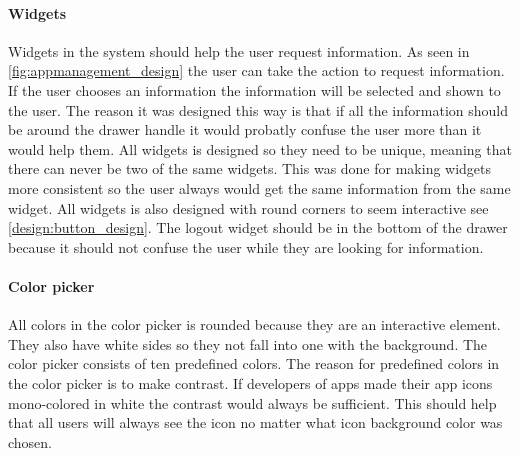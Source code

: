 \paragraph{Widgets}
\label{par:widgets}
Widgets in the \giraf[] system should help the user request information. As seen in \autoref{fig:appmanagement_design} the user can take the action to request information. If the user chooses an information the information will be selected and shown to the user.
The reason it was designed this way is that if all the information should be around the drawer handle it would probatly confuse the user more than it would help them.
All widgets is designed so they need to be unique, meaning that there can never be two of the same widgets. This was done for making widgets more consistent so the user always would get the same information from the same widget. All widgets is also designed with round corners to seem interactive see \autoref{design:button_design}.
The logout widget should be in the bottom of the drawer because it should not confuse the user while they are looking for information.

\paragraph{Color picker}
\label{par:colorpicker}
All colors in the color picker is rounded because they are an interactive element. They also have white sides so they not fall into one with the background. The color picker consists of ten predefined colors. The reason for predefined colors in the color picker is to make contrast. If developers of \giraf[] apps made their app icons mono-colored in white the contrast would always be sufficient. This should help that all users will always see the icon no matter what icon background color was chosen.